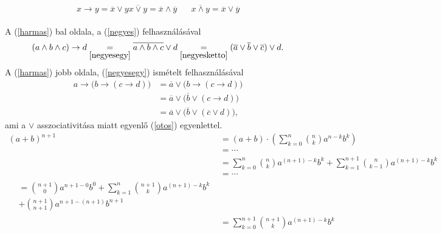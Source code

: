 \documentclass{article}
\begin{document}
\begin{subequations}\label{negyes}
\begin{equation}\label{negyesegy}
x\rightarrow y = \overline{x} \vee y
\end{equation}
\begin{equation}\label{negyesketto}
\overline{x\vee y} = \overline{x} \wedge \overline{y} \hspace{20pt} \overline{x\wedge y} = \overline{x} \vee \overline{y}
\end{equation}
\end{subequations}\\

A (\ref{harmas}) bal oldala, a (\ref{negyes}) felhasználásával
\begin{gather} \label{otos}
(a\wedge b \wedge c)\rightarrow d \underset{\ref{negyesegy}}{=} \overline{a\wedge b \wedge c}\vee d \underset{\ref{negyesketto}}{=} (\overline{a}\vee \overline{b} \vee \overline{c}) \vee d.
\end{gather}
A (\ref{harmas}) jobb oldala, (\ref{negyesegy}) ismételt felhasználásával
\begin{align} \nonumber
a\rightarrow \bigr( b\rightarrow (c\rightarrow d)\bigr) & = \overline{a} \vee \bigr(b \rightarrow (c \rightarrow d)\bigr)\\
&=\overline{a} \vee \bigr(\overline{b} \vee (c \rightarrow d)\bigr) \\ \nonumber
&=\overline{a} \vee \bigr(\overline{b} \vee (\overline{c} \vee d)\bigr),
\end{align}
ami a $\vee$ asszociativitása miatt egyenlő (\ref{otos}) egyenlettel.\\

\begin{subequations}
\begin{align}
(a+b)^{n+1} & = (a+b) \cdot \left( \sum_{k=0}^n \binom{n}{k} a^{n-k}b^k \right) \\ \nonumber
& =\cdots \\
& = \sum_{k=0}^n \binom{n}{k} a^{(n+1)-k}b^k + \sum_{k=1}^{n+1} \binom{n}{k-1} a^{(n+1)-k}b^{k}\\ \nonumber
& =\cdots\\
\begin{split}
& = \binom{n+1}{0} a^{n+1-0} b^0 + \sum_{k=1}^n \binom{n+1}{k} a^{(n+1)-k}b^k \\ & + \binom{n+1}{n+1} a^{n+1-(n+1)} b^{n+1}
\end{split} \\
& = \sum_{k=0}^{n+1} \binom{n+1}{k} a^{(n+1)-k}b^k
\end{align}
\end{subequations}
\end{document}
